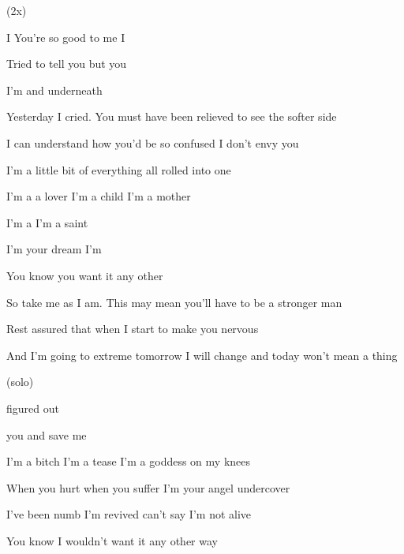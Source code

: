 
(2x)

   

\zs
I  You're so good to me I 

Tried to tell you but you 

I'm and  underneath 
 \ks

\zs
Yesterday I cried. You must have been relieved to see the softer side

I can understand how you'd be so confused I don't envy you

I'm a little bit of everything all rolled into one
\ks

\zr
I'm a  a lover I'm a child I'm a mother

I'm a  I'm a saint 

I'm your  dream I'm 

You know you  want it any other 
\kr

\zs
So take me as I am. This may mean you'll have to be a stronger man

Rest assured that when I start to make you nervous

And I'm going to extreme tomorrow I will change and today won't mean a thing
\ks

\zr

\kr

\zr (solo) \kr

 figured out  

 you  and  save me

\zr
\kr

\zr
I'm a bitch I'm a tease I'm a goddess on my knees

When you hurt when you suffer I'm your angel undercover

I've been numb I'm revived can't say I'm not alive

You know I wouldn't want it any other way
\kr

        

      


\kp